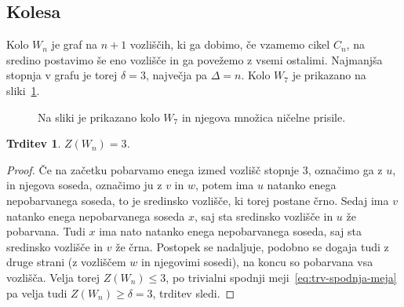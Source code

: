 \documentclass[12pt,a4paper,twoside]{article}
\theoremstyle{definition} %
\theoremstyle{plain} %
\newtheorem{trditev}[definicija]{Trditev}
\numberwithin{equation}{section}  %
\begin{document}
\subsection{Kolesa}
Kolo $W_n$ je graf na $n+1$ vozliščih, ki ga dobimo, če vzamemo cikel $C_n$, na sredino postavimo še eno vozlišče in ga povežemo z vsemi ostalimi. Najmanjša stopnja v grafu je torej $\delta = 3$, največja pa $\Delta = n$. Kolo $W_7$ je prikazano na sliki~\ref{fig:kolo}.
\begin{figure}[h]
    \centering
    \caption{Na sliki je prikazano kolo $W_7$ in njegova množica ničelne prisile.}
    \label{fig:kolo}
\end{figure}
\begin{trditev}
    $Z(W_n) = 3$.
\end{trditev}
\begin{proof}
    Če na začetku pobarvamo enega izmed vozlišč stopnje 3, označimo ga z $u$, in njegova soseda, označimo ju z $v$ in $w$, potem ima $u$ natanko enega nepobarvanega soseda, to je sredinsko vozlišče, ki torej postane črno. Sedaj ima $v$ natanko enega nepobarvanega soseda $x$, saj sta sredinsko vozlišče in $u$ že pobarvana. Tudi $x$ ima nato natanko enega nepobarvanega soseda, saj sta sredinsko vozlišče in $v$ že črna. Postopek se nadaljuje, podobno se dogaja tudi z druge strani (z vozliščem $w$ in njegovimi sosedi), na koncu so pobarvana vsa vozlišča. Velja torej $Z(W_n) \leq 3$, po trivialni spodnji meji~\ref{eq:trv-spodnja-meja} pa velja tudi $Z(W_n) \geq \delta = 3$, trditev sledi.
\end{proof}
\end{document}
